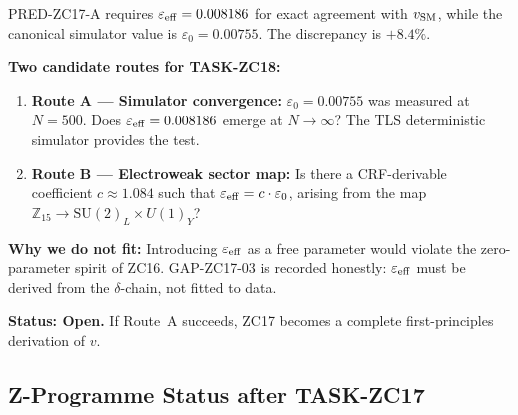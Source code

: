 \documentclass[12pt, a4paper]{article}
\begin{document}
\begin{openqbox}[title={GAP-ZC17-03: Origin of $\varepsilon_{\rm eff}$ (Open, Critical)}]
PRED-ZC17-A requires $\varepsilon_{\rm eff}=0.008186$ for exact
agreement with $v_{\rm SM}$, while the canonical simulator value
is $\varepsilon_0=0.00755$. The discrepancy is $+8.4\%$.

\textbf{Two candidate routes for TASK-ZC18:}

\begin{enumerate}[leftmargin=*, noitemsep]
\item \textbf{Route A --- Simulator convergence:}
  $\varepsilon_0=0.00755$ was measured at $N=500$.
  Does $\varepsilon_{\rm eff}=0.008186$ emerge at $N\to\infty$?
  The TLS deterministic simulator provides the test.

\item \textbf{Route B --- Electroweak sector map:}
  Is there a CRF-derivable coefficient $c\approx1.084$ such
  that $\varepsilon_{\rm eff} = c\cdot\varepsilon_0$,
  arising from the map
  $\mathbb{Z}_{15}\to\mathrm{SU}(2)_L\!\times\!U(1)_Y$?
\end{enumerate}

\textbf{Why we do not fit:}
Introducing $\varepsilon_{\rm eff}$ as a free parameter would
violate the zero-parameter spirit of ZC16. GAP-ZC17-03 is
recorded honestly: $\varepsilon_{\rm eff}$ must be derived
from the $\delta$-chain, not fitted to data.

\textbf{Status: Open.} If Route~A succeeds,
ZC17 becomes a complete first-principles derivation of $v$.
\end{openqbox}

\subsection{Z-Programme Status after TASK-ZC17}
\label{zc17:sec:status}
\end{document}
